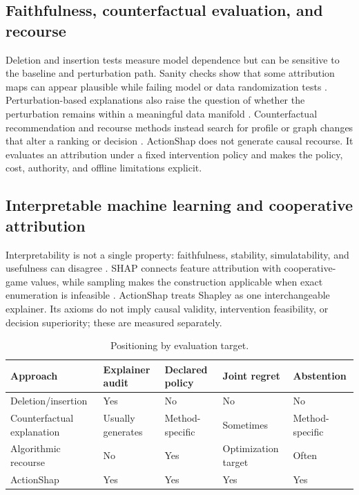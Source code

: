 \documentclass[pdflatex,sn-mathphys-num]{sn-jnl}
\begin{document}
\subsection{Faithfulness, counterfactual evaluation, and recourse}
Deletion and insertion tests measure model dependence but can be sensitive to the baseline and perturbation path. Sanity checks show that some attribution maps can appear plausible while failing model or data randomization tests \cite{adebayo2018}. Perturbation-based explanations also raise the question of whether the perturbation remains within a meaningful data manifold \cite{hooker2019}. Counterfactual recommendation and recourse methods instead search for profile or graph changes that alter a ranking or decision \cite{ghazimatin2020,tran2021,tan2021,yao2022,baklanov2024,barkan2024,gurevitch2025,mohammadi2025,nguyen2026,wachter2017,karimi2021}. ActionShap does not generate causal recourse. It evaluates an attribution under a fixed intervention policy and makes the policy, cost, authority, and offline limitations explicit.

\subsection{Interpretable machine learning and cooperative attribution}
Interpretability is not a single property: faithfulness, stability, simulatability, and usefulness can disagree \cite{gilpin2018,arrieta2020,molnar2022,samek2017,deyoung2020}. SHAP connects feature attribution with cooperative-game values, while sampling makes the construction applicable when exact enumeration is infeasible \cite{shapley1953,castro2009,lundberg2020,covert2021}. ActionShap treats Shapley as one interchangeable explainer. Its axioms do not imply causal validity, intervention feasibility, or decision superiority; these are measured separately.

\begin{table}[t]
\centering
\small
\caption{Positioning by evaluation target.}
\label{tab:positioning}
\setlength{\tabcolsep}{2pt}
\begin{tabular}{@{}p{.23\linewidth}p{.15\linewidth}p{.17\linewidth}p{.15\linewidth}p{.14\linewidth}@{}}
\toprule
Approach & Explainer audit & Declared policy & Joint regret & Abstention\\
\midrule
Deletion/insertion & Yes & No & No & No\\
Counterfactual explanation & Usually generates & Method-specific & Sometimes & Method-specific\\
Algorithmic recourse & No & Yes & Optimization target & Often\\
ActionShap & Yes & Yes & Yes & Yes\\
\bottomrule
\end{tabular}
\end{table}
\end{document}
